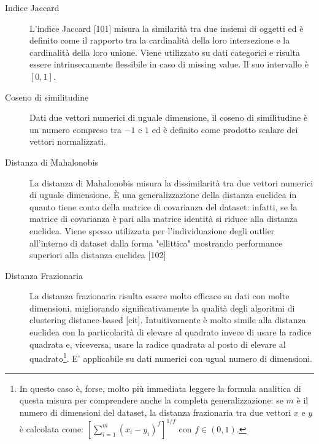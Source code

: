 \begin{description}
\item[Indice Jaccard] L'indice Jaccard [101] misura la similarit\`a tra due insiemi di oggetti ed \`e definito come il rapporto tra la cardinalit\`a della loro intersezione e la cardinalit\`a della loro unione. Viene utilizzato su dati categorici e risulta essere intrinsecamente flessibile in caso di missing value. Il suo intervallo \`e $ [0, 1] $.

\item[Coseno di similitudine] Dati due vettori numerici di uguale dimensione, il coseno di similitudine \`e un numero compreso tra $ -1 $ e $ 1 $ ed \`e definito come prodotto scalare dei vettori normalizzati.

\item[Distanza di Mahalonobis] La distanza di Mahalonobis misura la dissimilarit\`a tra due vettori numerici di uguale dimensione. \`E una generalizzazione della distanza euclidea in quanto tiene conto della matrice di covarianza del dataset: infatti, se la matrice di covarianza \`e pari alla matrice identit\`a si riduce alla distanza euclidea. Viene spesso utilizzata per l'individuazione degli outlier all'interno di dataset dalla forma "ellittica" mostrando performance superiori alla distanza euclidea [102]

\item[Distanza Frazionaria] La distanza frazionaria risulta essere molto efficace su dati con molte dimensioni, migliorando significativamente la qualit\`a degli algoritmi di clustering distance-based [cit]. Intuitivamente \`e molto simile alla distanza euclidea con la particolarit\`a di elevare al quadrato invece di usare la radice quadrata e, viceversa, usare la radice quadrata al posto di elevare al quadrato\footnote{In questo caso \`e, forse, molto pi\`u immediata leggere la formula analitica di questa misura per comprendere anche la completa generalizzazione: se $ m $ \`e il numero di dimensioni del dataset, la distanza frazionaria tra due vettori $ x $ e $ y $ \`e calcolata come: $ [\sum\limits_{i=1}^m (x_{i} - y_{i})^{f}]^{1/f} $ con $ f \in (0,1) $.}. E' applicabile su dati numerici con ugual numero di dimensioni.
\end{description}